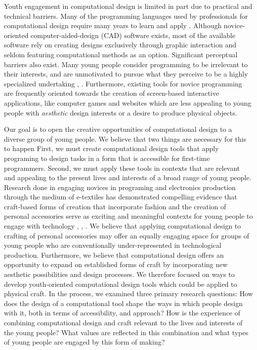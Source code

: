 \documentclass{sigchi}
\begin{document}
Youth engagement in computational design is limited in part due to practical and technical barriers. Many of the programming languages used by professionals for computational design require many years to learn and apply \cite{reas}. Although novice-oriented computer-aided-design (CAD) software exists, most of the available software rely on creating designs exclusively through graphic interaction and seldom featuring computational methods as an option. Significant perceptual barriers also exist. Many young people consider programming to be irrelevant to their interests, and are unmotivated to pursue what they perceive to be a highly specialized undertaking \cite{resnick1}, \cite{introductory_programming}. Furthermore, existing tools for novice programming are frequently oriented towards the creation of screen-based interactive applications, like computer games and websites which are less appealing to young people with \textit{aesthetic} design interests or a desire to produce physical objects.

Our goal is to open the creative opportunities of computational design to a diverse group of young people. We believe that two things are necessary for this to happen First, we must create computational design tools that apply programing to design tasks in a form that is accessible for first-time programmers. Second, we must apply these tools in contexts that are relevant and appealing to the present lives and interests of a broad range of young people. Research done in engaging novices in programing and electronics production through the medium of e-textiles has demonstrated compelling evidence that craft-based forms of creation that incorporate fashion and the creation of personal accessories serve as exciting and meaningful contexts for young people to engage with technology \cite{buechley_wild}, \cite{kafai}, \cite{kanjun}. We believe that applying computational design to crafting of personal accessories may offer an equally engaging space for groups of young people who are conventionally under-represented in technological production. Furthermore, we believe that computational design offers an opportunity to expand on established forms of craft by incorporating new aesthetic possibilities and design processes. We therefore focused on ways to develop youth-oriented computational design tools which could be applied to physical craft.  In the process, we examined three primary research questions: How does the design of a computational tool shape the ways in which people design with it, both in terms of accessibility, and approach? How is the experience of combining computational design and craft relevant to the lives and interests of the young people? What values are reflected in this combination and what types of young people are engaged by this form of making?
 
\end{document}
